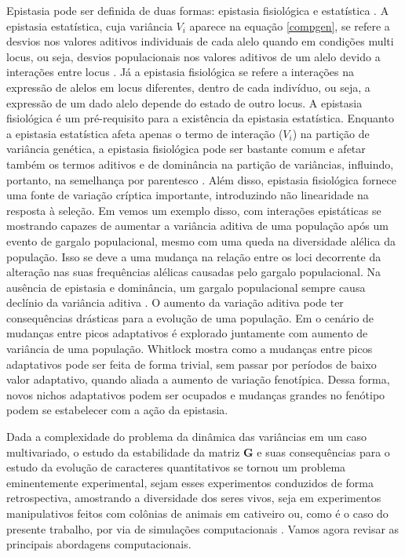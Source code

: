 Epistasia pode ser definida de duas formas: epistasia fisiológica e
estatística \citep{Cheverud1995}.
A epistasia estatística, cuja variância $V_i$ aparece na equação
\ref{compgen}, se refere a desvios nos valores aditivos individuais de
cada alelo quando em condições multi locus, ou seja, desvios
populacionais nos valores aditivos de um alelo devido a interações entre
locus \citep{Falconer1996}.
Já a epistasia fisiológica se refere a interações na expressão de alelos
em locus diferentes, dentro de cada indivíduo, ou seja, a expressão de
um dado alelo depende do estado de outro locus.
A epistasia fisiológica é um pré-requisito para a existência da 
epistasia estatística.
Enquanto a epistasia estatística afeta apenas o termo de interação
($V_i$) na partição de variância genética, a epistasia fisiológica pode
ser bastante comum e afetar também os termos aditivos e de dominância na
partição de variâncias, influindo, portanto, na semelhança por
parentesco \citep{Crow1970, Falconer1996, Cheverud1995, Cheverud1996a}.
Além disso, epistasia fisiológica fornece uma fonte de variação críptica
importante, introduzindo não linearidade na resposta à seleção.
Em \cite{Cheverud1996a} vemos um exemplo disso, com interações
epistáticas se mostrando capazes de aumentar a variância aditiva de uma
população após um evento de gargalo populacional, mesmo com uma queda na
diversidade alélica da população.
Isso se deve a uma mudança na relação entre os loci decorrente da
alteração nas suas frequências alélicas causadas pelo gargalo
populacional.
Na ausência de epistasia e dominância, um gargalo populacional sempre
causa declínio da variância aditiva \citep{Falconer1996}.
O aumento da variação aditiva pode ter consequências drásticas para a
evolução de uma população.
Em \cite{Whitlock1995} o cenário de mudanças entre picos adaptativos é
explorado juntamente com aumento de variância de uma população. 
Whitlock mostra como a mudanças entre picos adaptativos pode ser
feita de forma trivial, sem passar por períodos de baixo valor
adaptativo, quando aliada a aumento de variação fenotípica. 
Dessa forma, novos nichos adaptativos podem ser ocupados e mudanças
grandes no fenótipo podem se estabelecer com a ação da epistasia.

Dada a complexidade do problema da dinâmica das variâncias em um caso
multivariado, o estudo da estabilidade da matriz $\mathbf{G}$ e suas
consequências para o estudo da evolução de caracteres quantitativos se
tornou um problema eminentemente experimental, sejam esses experimentos
conduzidos de forma retrospectiva, amostrando a diversidade dos seres
vivos, seja em experimentos manipulativos feitos com colônias de animais
em cativeiro ou, como é o caso do presente trabalho, por via de
simulações computacionais \citep[para uma revisão sobre estabilidade da
matriz $\mathbf{G}$ veja][]{Arnold2008}.
Vamos agora revisar as principais abordagens computacionais.


